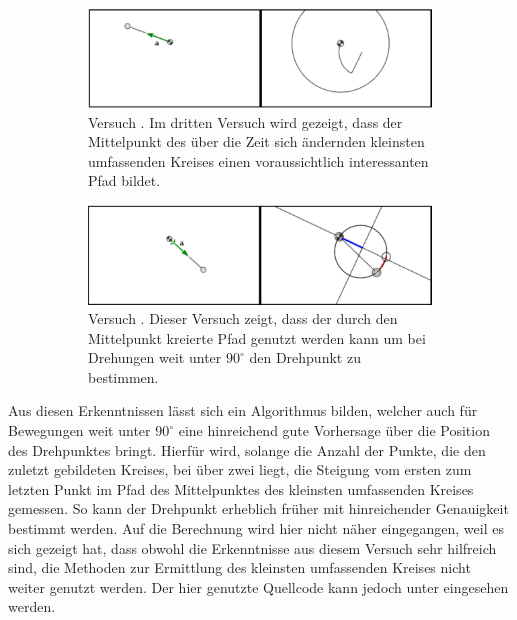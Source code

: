 \begin{figure}
    \centering
    \begin{subfigure}[t]{0.45\textwidth}
        \includegraphics[width=\textwidth]{gfx/pendel1_3.png}
        \caption{Versuch . Im dritten Versuch wird gezeigt, dass der Mittelpunkt des über die Zeit sich ändernden kleinsten umfassenden Kreises einen voraussichtlich interessanten Pfad bildet.}\label{fig:pendel1_3}
    \end{subfigure}
    \begin{subfigure}[t]{0.45\textwidth}
        \includegraphics[width=\textwidth]{gfx/pendel1_4.png}
        \caption{Versuch . Dieser Versuch zeigt, dass der durch den Mittelpunkt kreierte Pfad genutzt werden kann um bei Drehungen weit unter $90^\circ$ den Drehpunkt zu bestimmen.}\label{fig:pendel1_4}
    \end{subfigure}
    \caption[Versuche  und ]{}
    \label{fig:pendel1_3_4}
\end{figure}

Aus diesen Erkenntnissen lässt sich ein Algorithmus bilden, welcher auch für Bewegungen weit unter $90^\circ$ eine hinreichend gute Vorhersage über die Position des Drehpunktes bringt.
Hierfür wird, solange die Anzahl der Punkte, die den zuletzt gebildeten Kreises, bei über zwei liegt, die Steigung vom ersten zum letzten Punkt im Pfad des Mittelpunktes des kleinsten umfassenden Kreises gemessen.
So kann der Drehpunkt erheblich früher mit hinreichender Genauigkeit bestimmt werden.
Auf die Berechnung wird hier nicht näher eingegangen, weil es sich gezeigt hat, dass obwohl die Erkenntnisse aus diesem Versuch sehr hilfreich sind, die Methoden zur Ermittlung des kleinsten umfassenden Kreises nicht weiter genutzt werden.
Der hier genutzte Quellcode kann jedoch unter  eingesehen werden.

